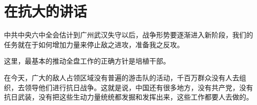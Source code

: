 \section[在抗大的讲话（一九三八年十二月十三日）]{在抗大的讲话}


中共中央六中全会估计到广州武汉失守以后，战争形势要逐渐进入新阶段，我们的任务就在于如何增加力量来停止敌之进攻，准备我之反攻。

这里，最基本的推动全盘工作的正确方针是培植干部。

在今天，广大的敌人占领区域没有普遍的游击队的活动，千百万群众没有人去组织，去领导他们进行抗日战争。这就是说，中国还有很多地方，没有共产党，没有抗日武装，没有把这些生动力量统统都发掘和发挥出来，这些工作都要人去做的。

